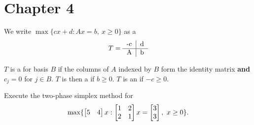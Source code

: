 \documentclass{exam}
\begin{document}
    \section{Chapter 4}\label{sec:chapter4}
    \begin{notation}
        We write $\max \{ cx+d:Ax=b,\ x\ge 0 \}$ as a 
        \[
            T =
            \begin{tabular}{c|c}
                -c & d \\ \hline
                A & b
            \end{tabular}
        \]
    \end{notation}
    \begin{define}
        $T$ is a  for basis $B$ if the columns of $A$ indexed by $B$ form the identity matrix \textbf{and} $c_{j}=0$ for $j \in B$.
        $T$ is then a  if $b \ge 0$.
        $T$ is an  if $-c \ge 0$.
    \end{define}
    \begin{question}
        Execute the two-phase simplex method for
        \[
            \max \{ \matrix{ 5 & 4}x : \matrix{1 & 2 \\ 2 & 1} x = \matrix{3\\3},\ x \ge 0 \}.
        \]
    \end{question}
\end{document}
